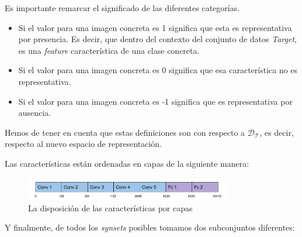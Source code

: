 \documentclass[12,twoside]{TFG-GM}
\theoremstyle{definition}
\theoremstyle{remark}
\begin{document}
Es importante remarcar el significado de las diferentes categorías.
\begin{itemize}
\item Si el valor para una imagen concreta es 1 significa que esta es representativa por presencia. Es decir, que dentro del contexto del conjunto de datos \textit{Target}, es una \textit{feature} característica de una clase concreta.
\item Si el valor para una imagen concreta es 0 significa que esa característica no es representativa.
\item Si el valor para una imagen concreta es -1 significa que es representativa por ausencia. 
\end{itemize}

Hemos de tener en cuenta que estas definiciones son con respecto a $\mathcal{D_T}$, es decir, respecto al nuevo espacio de representación.  

Las características están ordenadas en capas de la siguiente manera: 
\begin{figure}[H]
\label{}
\centering
\includegraphics[width = 0.8\textwidth]{Images/croplayer.png} 
\caption{La disposición de las características por capas \label{fig:featuresperlayer}}
\end{figure}


Y finalmente, de todos los \textit{synsets} posibles tomamos dos subconjuntos diferentes: 
\end{document}

